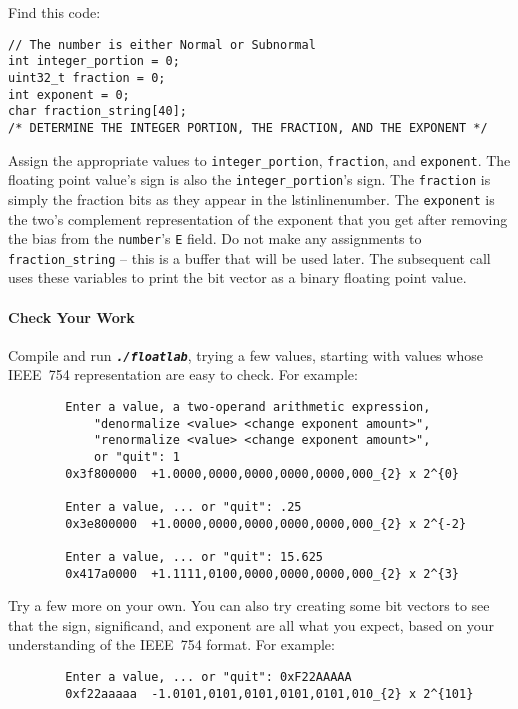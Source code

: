     Find this code:

    \begin{lstlisting}
// The number is either Normal or Subnormal
int integer_portion = 0;
uint32_t fraction = 0;
int exponent = 0;
char fraction_string[40];
/* DETERMINE THE INTEGER PORTION, THE FRACTION, AND THE EXPONENT */
    \end{lstlisting}

    Assign the appropriate values to \lstinline{integer_portion}, \lstinline{fraction}, and \lstinline{exponent}.
    The floating point value's sign is also the \lstinline{integer_portion}'s sign.
    The \lstinline{fraction} is simply the fraction bits as they appear in the lstinline{number}.
    The \lstinline{exponent} is the two's complement representation of the exponent that you get after removing the bias from the \lstinline{number}'s \texttt{E} field.
    Do not make any assignments to \lstinline{fraction_string} -- this is a buffer that will be used later.
    The subsequent  call uses these variables to print the bit vector as a binary floating point value.

    \paragraph*{Check Your Work}

    Compile and run \texttt{\textbf{\textit{./floatlab}}}, trying a few values, starting with values whose IEEE~754 representation are easy to check.
    For example:

    \begin{verbatim}
        Enter a value, a two-operand arithmetic expression,
            "denormalize <value> <change exponent amount>",
            "renormalize <value> <change exponent amount>",
            or "quit": 1
        0x3f800000	+1.0000,0000,0000,0000,0000,000_{2} x 2^{0}

        Enter a value, ... or "quit": .25
        0x3e800000	+1.0000,0000,0000,0000,0000,000_{2} x 2^{-2}

        Enter a value, ... or "quit": 15.625
        0x417a0000	+1.1111,0100,0000,0000,0000,000_{2} x 2^{3}
    \end{verbatim}

    Try a few more on your own.
    You can also try creating some bit vectors to see that the sign, significand, and exponent are all what you expect, based on your understanding of the IEEE~754 format.
    For example:

    \begin{verbatim}
        Enter a value, ... or "quit": 0xF22AAAAA
        0xf22aaaaa	-1.0101,0101,0101,0101,0101,010_{2} x 2^{101}
    \end{verbatim}

